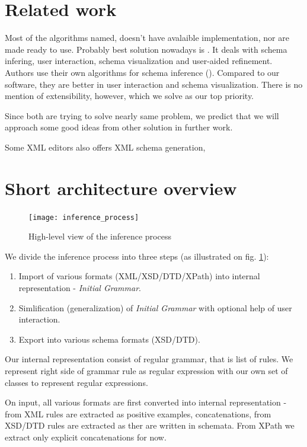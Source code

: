 \documentclass[a4paper,8pt,oneside,twocolumn]{article}
\begin{document}
\section*{Related work}
Most of the algorithms named, doesn't have avalaible implementation, nor are made ready to use.
Probably best solution nowadays is \cite{Bex:2008:SSI:1376616.1376750}.
It deals with schema infering, user interaction, schema visualization and user-aided refinement.
Authors use their own algorithms for schema inference (\cite{Bex:2006:ICD:1182635.1164139, Bex:2007:IXS:1325851.1325964}).
Compared to our software, they are better in user interaction and schema visualization.
There is no mention of extensibility, however, which we solve as our top priority.

Since both are trying to solve nearly same problem, we predict that we will approach some good ideas from other solution in further work.

Some XML editors also offers XML schema generation, 

\section*{Short architecture overview}
\begin{figure}
	\centering\texttt{[image: inference\_process]}
	\caption{High-level view of the inference process} \label{inference_process}
\end{figure}
We divide the inference process into three steps (as illustrated on fig. \ref{inference_process}):
\begin{enumerate}
	\item Import of various formats (XML/XSD/DTD/XPath) into internal representation - \emph{Initial Grammar}.
	\item Simlification (generalization) of \emph{Initial Grammar} with optional help of user interaction.
	\item Export into various schema formats (XSD/DTD).
\end{enumerate}	
Our internal representation consist of regular grammar, that is list of rules.
We represent right side of grammar rule as regular expression with our own set of classes to represent regular expressions.

On input, all various formats are first converted into internal representation - from XML rules are extracted as positive examples, concatenations, from XSD/DTD rules are extracted as ther are written in schemata. From XPath we extract only explicit concatenations for now.
\end{document}
